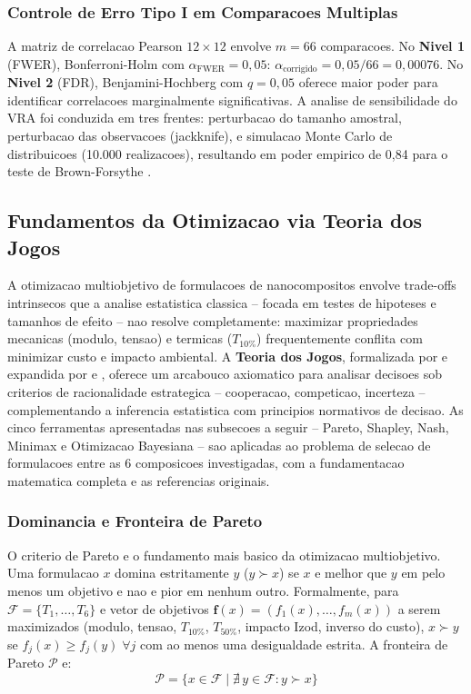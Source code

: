 \documentclass[11pt,a4paper,oneside]{article}
\begin{document}
\subsubsection{Controle de Erro Tipo I em Comparacoes Multiplas}

A matriz de correlacao Pearson $12{\times}12$ envolve $m{=}66$ comparacoes. No {\bfseries Nivel 1}
(FWER), Bonferroni-Holm com $\alpha_{\text{FWER}}{=}0{,}05$: $\alpha_{\text{corrigido}}{=}0{,}05/66{=}0{,}00076$. No {\bfseries Nivel 2} (FDR), Benjamini-Hochberg com $q{=}0{,}05$ oferece maior poder para identificar correlacoes marginalmente significativas.
A analise de sensibilidade do VRA foi conduzida em tres frentes: perturbacao do tamanho amostral,
perturbacao das observacoes (jackknife), e simulacao Monte Carlo de distribuicoes (10.000
realizacoes), resultando em poder empirico de 0,84 para o teste de Brown-Forsythe \cite{Montgomery2020}.

\subsection{Fundamentos da Otimizacao via Teoria dos Jogos}\label{sec:teoria_jogos}

A otimizacao multiobjetivo de formulacoes de nanocompositos envolve trade-offs intrinsecos que
a analise estatistica classica -- focada em testes de hipoteses e tamanhos de efeito -- nao
resolve completamente: maximizar propriedades mecanicas (modulo, tensao) e termicas ($T_{10\%}$)
frequentemente conflita com minimizar custo e impacto ambiental. A {\bfseries Teoria dos Jogos},
formalizada por \citet{VonNeumann1928} e expandida por \citet{Nash1950} e \citet{Shapley1953},
oferece um arcabouco axiomatico para analisar decisoes sob criterios de racionalidade
estrategica -- cooperacao, competicao, incerteza -- complementando a inferencia estatistica com
principios normativos de decisao. As cinco ferramentas apresentadas nas subsecoes a seguir --
Pareto, Shapley, Nash, Minimax e Otimizacao Bayesiana -- sao aplicadas ao problema de selecao
de formulacoes entre as 6 composicoes investigadas, com a fundamentacao matematica completa e
as referencias originais.

\subsubsection{Dominancia e Fronteira de Pareto}

O criterio de Pareto \cite{Pareto1906} e o fundamento mais basico da otimizacao multiobjetivo.
Uma formulacao $x$ domina estritamente $y$ ($y \succ x$) se $x$ e melhor que $y$ em pelo menos
um objetivo e nao e pior em nenhum outro. Formalmente, para $\mathcal{F} = \{T_1,\dots,T_6\}$ e
vetor de objetivos $\mathbf{f}(x) = (f_1(x),\dots,f_m(x))$ a serem maximizados (modulo, tensao,
$T_{10\%}$, $T_{50\%}$, impacto Izod, inverso do custo), $x \succ y$ se $f_j(x) \ge f_j(y)\;
\forall j$ com ao menos uma desigualdade estrita. A fronteira de Pareto $\mathcal{P}$ e:
\begin{equation}
\mathcal{P} = \{x \in \mathcal{F} \mid \nexists\, y \in \mathcal{F} : y \succ x\}
\label{eq:pareto_gt}
\end{equation}
\end{document}
